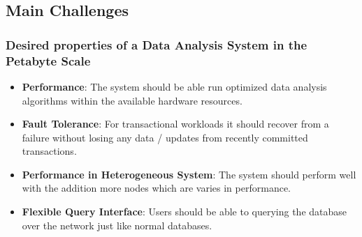 \documentclass{beamer}
\begin{document}
\subsection{Main Challenges}
\begin{frame}
  \frametitle{Desired properties of a Data Analysis System in the
    Petabyte Scale}
  \begin{itemize}
  \item {\bfseries{Performance}}: The system should be able run
    optimized data analysis algorithms within the available hardware
    resources.
  \item {\bfseries{Fault Tolerance}}: For transactional workloads it should recover
    from a failure without losing any data / updates from recently
    committed transactions.
  \item {\bfseries{Performance in Heterogeneous System}}: The system should perform
    well with the addition more nodes which are varies in performance.
  \item {\bfseries{Flexible Query Interface}}: Users should be able to querying the database over the network just like normal databases.
  \end{itemize}
\end{frame}




\end{document}
